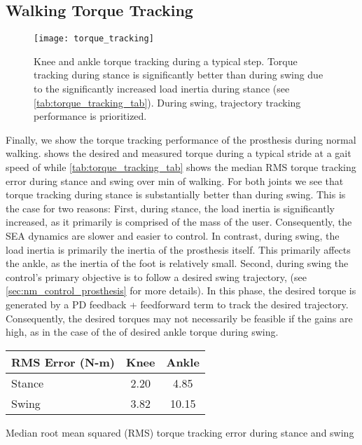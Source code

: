 \subsection{Walking Torque Tracking}
\begin{figure}[htb]
    \centering 
    \texttt{[image: torque\_tracking]}
    \caption{Knee and ankle torque tracking during a typical step. Torque
    tracking during stance is significantly better than during swing due to the
    significantly increased load inertia during stance (see
    \cref{tab:torque_tracking_tab}). During swing, trajectory tracking
    performance is prioritized.}\label{fig:torque_tracking_plot}
\end{figure}
Finally, we show the torque tracking performance of the prosthesis during normal
walking.  shows the desired and measured torque
during a typical stride at a gait speed of  while
\cref{tab:torque_tracking_tab} shows the median RMS torque tracking error during
stance and swing over \unit[1]{min} of walking. For both joints we see that
torque tracking during stance is substantially better than during swing.  This
is the case for two reasons: First, during stance, the load inertia is
significantly increased, as it primarily is comprised of the mass of the user.
Consequently, the SEA dynamics are slower and easier to control. In contrast,
during swing, the load inertia is primarily the inertia of the prosthesis
itself. This primarily affects the ankle, as the inertia of the foot is
relatively small. Second, during swing the control's primary objective is to
follow a desired swing trajectory, (see \cref{sec:nm_control_prosthesis} for
more details). In this phase, the desired torque is generated by a PD feedback +
feedforward term to track the desired trajectory. Consequently, the desired
torques may not necessarily be feasible if the gains are high, as in the case of
the of desired ankle torque during swing.
\begin{margintable}[-1in]
    \centering
    \small
    \begin{tabular}{lcc}
        RMS Error (N-m) & Knee & Ankle \\
        \midrule
        Stance & 2.20 & 4.85  \\
        Swing  & 3.82 & 10.15 \\
    \end{tabular}
    \caption{Median root mean squared (RMS) torque tracking error during stance
    and swing}\label{tab:torque_tracking_tab}
\end{margintable}
